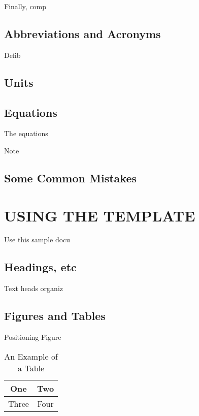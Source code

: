 \documentclass[letterpaper, 10 pt, conference]{ieeeconf}  %
\begin{document}



Finally, comp

\subsection{Abbreviations and Acronyms}
Defib

\subsection{Units}



\subsection{Equations}

The equations



Note

\subsection{Some Common Mistakes}

\section{USING THE TEMPLATE}

Use this sample docu

\subsection{Headings, etc}

Text heads organiz

\subsection{Figures and Tables}

Positioning Figure



\begin{table}[h]
\caption{An Example of a Table}
\label{table_example}
\begin{center}
\begin{tabular}{|c||c|}
\hline
One & Two\\
\hline
Three & Four\\
\hline
\end{tabular}
\end{center}
\end{table}
\end{document}
